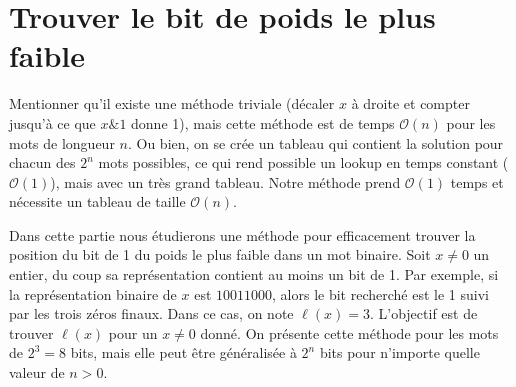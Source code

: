 \documentclass[11pt]{article}
\begin{document}
\begin{enumerate}

\end{enumerate}



\section{Trouver le bit de poids le plus faible}

\begin{remarque}
Mentionner qu'il existe une méthode triviale
(décaler $x$ à droite et compter jusqu'à ce que $x\&1$ donne 1),
mais cette méthode est de temps $\mathcal{O}(n)$ pour les mots
de longueur $n$. Ou bien, on se crée un tableau qui contient la
solution pour chacun des $2^n$ mots possibles, ce qui rend possible
un lookup en temps constant ($\mathcal{O}(1)$), mais avec un très grand tableau.
Notre méthode prend $\mathcal{O}(1)$ temps et nécessite un tableau
de taille $\mathcal{O}(n)$.
\end{remarque}

Dans cette partie nous étudierons une méthode pour efficacement trouver
la position du bit de 1 du poids le plus faible dans un mot binaire.
Soit $x\ne0$ un entier, du coup sa représentation contient au moins un bit de 1.
Par exemple, si la représentation binaire de $x$ est $10011000$, alors le bit
recherché est le 1 suivi par les trois zéros finaux. Dans ce
cas, on note $\ell(x)=3$. L'objectif est de trouver $\ell(x)$ pour un $x\ne0$
donné. On présente cette méthode pour les mots de $2^3=8$ bits, mais elle
peut être généralisée à $2^n$ bits pour n'importe quelle valeur de $n>0$.
\end{document}
